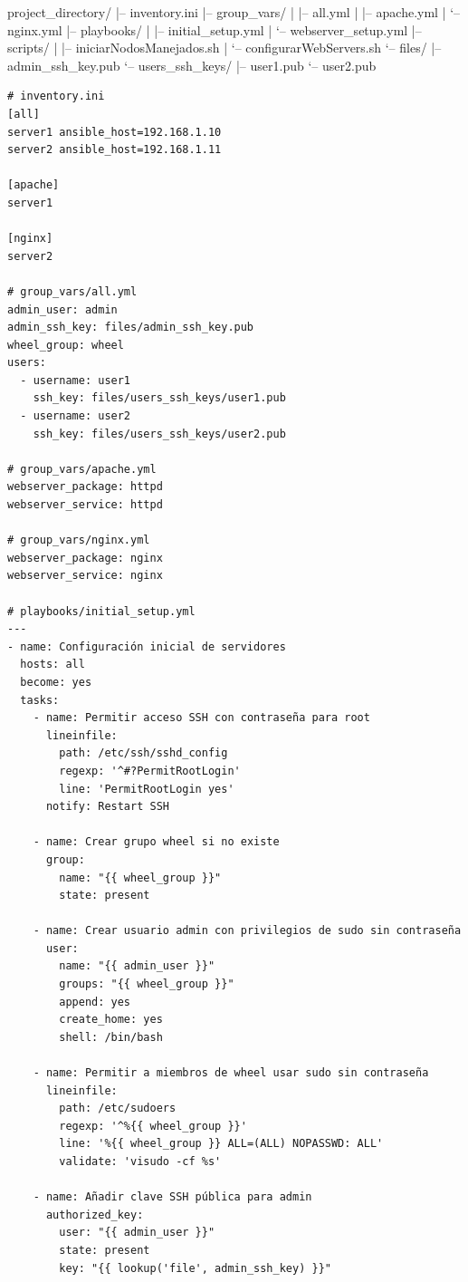 \begin{directorylisting}
  project_directory/
  |-- inventory.ini
  |-- group_vars/
  |   |-- all.yml
  |   |-- apache.yml
  |   `-- nginx.yml
  |-- playbooks/
  |   |-- initial_setup.yml
  |   `-- webserver_setup.yml
  |-- scripts/
  |   |-- iniciarNodosManejados.sh
  |   `-- configurarWebServers.sh
  `-- files/
      |-- admin_ssh_key.pub
      `-- users_ssh_keys/
          |-- user1.pub
          `-- user2.pub
  \end{directorylisting}


\begin{lstlisting}[style=yamlstyle, caption={Solución al ejercicio de Ansible}]
# inventory.ini
[all]
server1 ansible_host=192.168.1.10
server2 ansible_host=192.168.1.11

[apache]
server1

[nginx]
server2

# group_vars/all.yml
admin_user: admin
admin_ssh_key: files/admin_ssh_key.pub
wheel_group: wheel
users:
  - username: user1
    ssh_key: files/users_ssh_keys/user1.pub
  - username: user2
    ssh_key: files/users_ssh_keys/user2.pub

# group_vars/apache.yml
webserver_package: httpd
webserver_service: httpd

# group_vars/nginx.yml
webserver_package: nginx
webserver_service: nginx

# playbooks/initial_setup.yml
---
- name: Configuración inicial de servidores
  hosts: all
  become: yes
  tasks:
    - name: Permitir acceso SSH con contraseña para root
      lineinfile:
        path: /etc/ssh/sshd_config
        regexp: '^#?PermitRootLogin'
        line: 'PermitRootLogin yes'
      notify: Restart SSH

    - name: Crear grupo wheel si no existe
      group:
        name: "{{ wheel_group }}"
        state: present

    - name: Crear usuario admin con privilegios de sudo sin contraseña
      user:
        name: "{{ admin_user }}"
        groups: "{{ wheel_group }}"
        append: yes
        create_home: yes
        shell: /bin/bash

    - name: Permitir a miembros de wheel usar sudo sin contraseña
      lineinfile:
        path: /etc/sudoers
        regexp: '^%{{ wheel_group }}'
        line: '%{{ wheel_group }} ALL=(ALL) NOPASSWD: ALL'
        validate: 'visudo -cf %s'

    - name: Añadir clave SSH pública para admin
      authorized_key:
        user: "{{ admin_user }}"
        state: present
        key: "{{ lookup('file', admin_ssh_key) }}"


\end{lstlisting}
